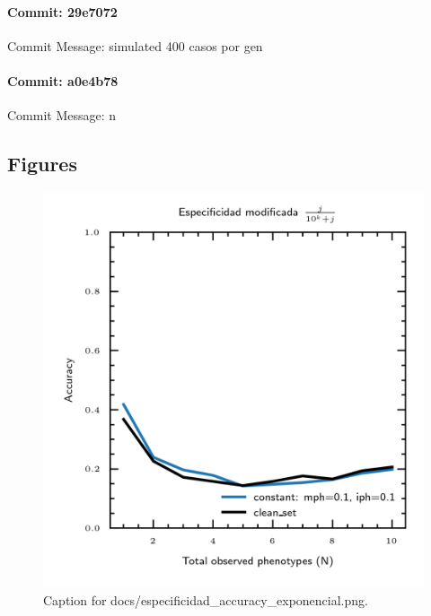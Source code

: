\documentclass{article}
\begin{document}
\paragraph{Commit: 29e7072}
Commit Message: simulated 400 casos por gen

\paragraph{Commit: a0e4b78}
Commit Message: n

\subsection{Figures}
\begin{figure}[h] \centering \includegraphics{docs/especificidad_accuracy_exponencial.png} \caption{Caption for docs/especificidad_accuracy_exponencial.png.} \end{figure}
\end{document}
